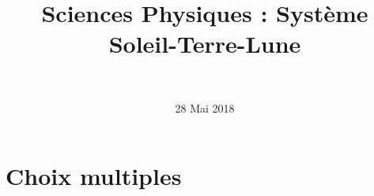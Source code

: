 \documentclass[a4paper,11pt]{exam}
\author{\ }
\date{28 Mai 2018}
\title{Sciences Physiques : Système Soleil-Terre-Lune}
\begin{document}
%	

	\maketitle
	
	



\section{Choix multiples}
\end{document}
